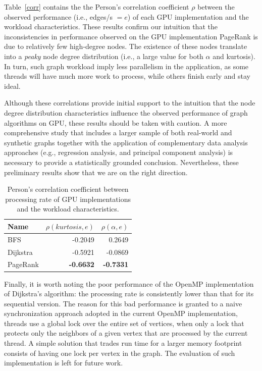 Table~\ref{corr} contains the the Person's correlation coefficient $\rho$ between the observed performance (i.e., edges/s $= e$) of each GPU implementation and the workload characteristics. These results confirm our intuition that the inconsistencies in performance observed on the GPU implementation PageRank is due to relatively few high-degree nodes. The existence of these nodes translate into a {\em peaky} node degree distribution (i.e., a large value for both $\alpha$ and kurtosis). In turn, such graph workload imply less parallelism in the application, as some threads will have much more work to process, while others finish early and stay ideal. 

Although these correlations provide initial support to the intuition that the node degree distribution characteristics influence the observed performance of graph algorithms on GPU, these results should be taken with caution. A more comprehensive study that includes a larger sample of both real-world and synthetic graphs together with the application of complementary data analysis approaches (e.g., regression analysis, and principal component analysis) is necessary to provide a statistically grounded conclusion. Nevertheless, these preliminary results show that we are on the right direction.

\begin{table}[ht]
\centering
\begin{tabular}{l|r|r}
Name     & $\rho(kurtosis,e)$ & $\rho(\alpha,e)$ \\\hline
BFS      & -0.2049       &  0.2649 \\\hline
Dijkstra & -0.5921       & -0.0869 \\\hline
PageRank & {\bf -0.6632} & {\bf -0.7331} \\\hline
\end{tabular}
\caption{Person's correlation coefficient between processing rate of GPU implementations and the workload characteristics.}
\label{tab:corr}
\end{table}

Finally, it is worth noting the poor performance of the OpenMP implementation of Dijkstra's algorithm: the processing rate is consistently lower than that for its sequential version. The reason for this bad performance is granted to a naive synchronization approach adopted in the current OpenMP implementation, threads use a global lock over the entire set of vertices, when only a lock that protects only the neighbors of a given vertex that are processed by the current thread. A simple solution that trades run time for a larger memory footprint consists of having one lock per vertex in the graph. The evaluation of such implementation is left for future work.
